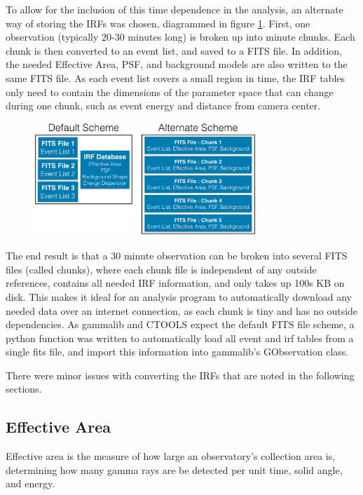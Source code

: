 To allow for the inclusion of this time dependence in the analysis, an alternate way of storing the IRFs was chosen, diagrammed in figure \ref{fig:fits_scheme}.
First, one observation (typically 20-30 minutes long) is broken up into  minute chunks.
Each chunk is then converted to an event list, and saved to a FITS file.
In addition, the needed Effective Area, PSF, and background models are also written to the same FITS file.
As each event list covers a small region in time, the IRF tables only need to contain the dimensions of the parameter space that can change during one chunk, such as event energy and distance from camera center.

\begin{figure}[ht]
  \begin{center}
    \includegraphics[width=0.75\textwidth]{images/FITS_diagrams_alternate_scheme.eps}
    \caption[FITS File Event Storage Schemes]{}\label{fig:fits_scheme}
  \end{center}
\end{figure}

The end result is that a 30 minute observation can be broken into several FITS files (called chunks), where each chunk file is independent of any outside references, contains all needed IRF information, and only takes up \nicetilde100s KB on disk.
This makes it ideal for an analysis program to automatically download any needed data over an internet connection, as each chunk is tiny and has no outside dependencies.
As gammalib and CTOOLS expect the default FITS file scheme, a python function was written to automatically load all event and irf tables from a single fits file, and import this information into gammalib's GObservation class.

There were minor issues with converting the IRFs that are noted in the following sections.

\subsection{Effective Area}\label{sec:effarea}
Effective area is the measure of how large an observatory's collection area is, determining how many gamma rays are be detected per unit time, solid angle, and energy.

